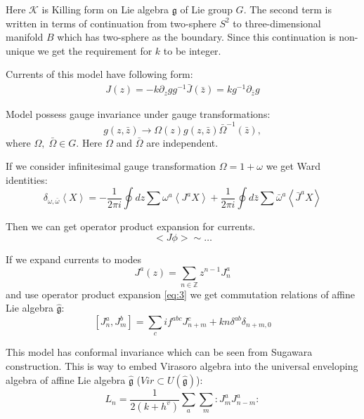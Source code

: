 \documentclass[12pt]{article}
\theoremstyle{definition}
\newcommand{\gf}{\mathfrak{g}}
\newcommand{\gfh}{\hat{\mathfrak{g}}}
\theoremstyle{definition} \newtheorem{Def}{Definition}
\begin{document}
 Here $\mathcal{K}$ is Killing form on Lie algebra $\gf$ of Lie group $G$. The second term is written in terms of continuation from two-sphere $S^{2}$ to three-dimensional manifold $B$ which has two-sphere as the boundary. Since this continuation is non-unique we get the requirement for $k$ to be integer. 

Currents of this model have following form:
  \begin{eqnarray}
    J(z)= -k \partial_zg g^{-1}
    \bar J(\bar z)=k g^{-1}\partial_{\bar z}g
  \end{eqnarray}

Model possess gauge invariance under gauge transformations:
  \begin{equation*}
    g(z,\bar z)\to \Omega(z)g(z,\bar z)\bar \Omega^{-1}(\bar z),
  \end{equation*}
  where $\Omega,\;\bar \Omega \in G$.
Here $\Omega$ and $\bar \Omega$ are independent. 

If we consider infinitesimal gauge transformation $\Omega=1+\omega$ we get Ward identities:
  \begin{equation}
    \label{eq:87}
    \delta_{\omega,\bar \omega}\left< X \right>=-\frac{1}{2\pi i}\oint dz \sum\omega^a \left< J^a X\right>+
    \frac{1}{2\pi i} \oint d\bar z \sum \bar \omega^a \left< \bar J^a X\right>
  \end{equation}

 Then we can get operator product expansion for currents. 
 \begin{equation}
   \label{eq:3}
   <J\phi>\sim \dots
 \end{equation}

If we expand currents to modes
\begin{equation*}
  J^a(z)=\sum\limits_{n\in \mathbb Z}z^{n-1}J^a_n 
\end{equation*}
and use operator product expansion \eqref{eq:3} we get commutation relations of affine Lie algebra $\gfh$:
\begin{equation}
  \left[J^a_n,J^b_m\right]=\sum_c i f^{abc}J^c_{n+m}+kn\delta^{ab}\delta_{n+m,0} 
\end{equation}

This model has conformal invariance which can be seen from 
Sugawara construction. This is way to embed Virasoro algebra into the universal enveloping algebra of affine Lie algebra $\gfh$ ($Vir\subset U(\gfh)$):
\begin{equation}
  \label{eq:4}
  L_n=\frac{1}{2(k+h^v)}\sum\limits_a\sum\limits_m:J^a_m J^a_{n-m}:
\end{equation}
  
\end{document}
